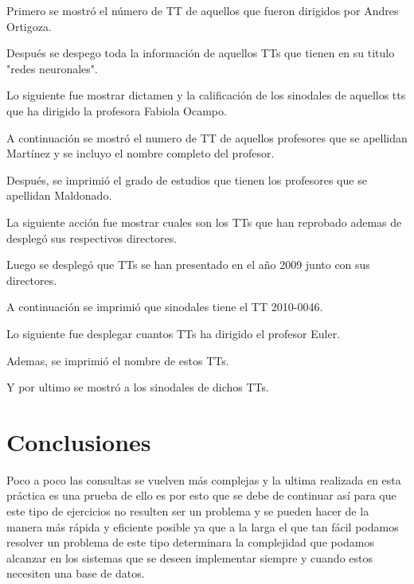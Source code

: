 \documentclass[12pt, titlepage]{article}
\begin{document}
	Primero se mostró el número de TT de aquellos que fueron dirigidos por Andres Ortigoza.
	
	Después se despego toda la información de aquellos TTs que tienen en su titulo "redes neuronales".
	
	Lo siguiente fue mostrar dictamen y la calificación de los sinodales de aquellos tts que ha dirigido la profesora Fabiola Ocampo.
	
	A continuación se mostró el numero de TT de aquellos profesores que se apellidan Martínez y se incluyo el nombre completo del profesor.
	
	Después, se imprimió el grado de estudios que tienen los profesores que se apellidan Maldonado.
	
	La siguiente acción fue mostrar cuales son los TTs que han reprobado ademas de desplegó sus respectivos directores.
	
	Luego se desplegó que TTs se han presentado en el año 2009 junto con sus directores.
	
	A continuación se imprimió que sinodales tiene el TT 2010-0046.
	
	Lo siguiente fue desplegar cuantos TTs ha dirigido el profesor Euler.
	
	Ademas, se imprimió el nombre de estos TTs.
	
	Y por ultimo se mostró a los sinodales de dichos TTs.
	\section{Conclusiones}
	Poco a poco las consultas se vuelven más complejas y la ultima realizada en esta práctica es una prueba de ello es por esto que se debe de continuar así para que este tipo de ejercicios no resulten ser un problema y se pueden hacer de la manera más rápida y eficiente posible ya que a la larga el que tan fácil podamos resolver un problema de este tipo determinara la complejidad que podamos alcanzar en los sistemas que se deseen implementar siempre y cuando estos necesiten una base de datos.
	 
	
\end{document}
